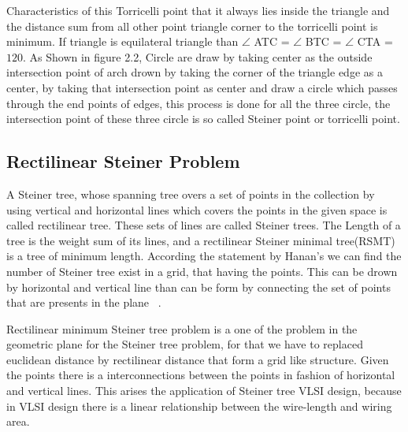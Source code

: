  Characteristics of this Torricelli point that it always lies inside the triangle and the distance sum from all other point triangle corner to the torricelli point is minimum. If triangle is equilateral triangle than $\angle$ ATC = $\angle$ BTC = $\angle$ CTA = $120$. As Shown in figure 2.2, Circle are draw by taking center as the outside intersection point of arch drown by taking the corner of the triangle edge as a center, by taking that intersection point as center and  draw a circle which passes through the end points of edges, this process is done for all the three circle, the intersection point of these three circle is so called Steiner point or torricelli point.   

 
\subsection{Rectilinear Steiner Problem}
A Steiner tree, whose spanning tree overs a set of points in the collection by using vertical and horizontal lines which covers the points in the given space is called rectilinear tree. These sets of lines are called Steiner trees. The Length of a tree is the weight sum of its lines, and a rectilinear Steiner minimal tree(RSMT) is a tree of minimum length. According the statement by Hanan's we can find the number of Steiner tree exist in a grid, that having the points. This can be drown by horizontal and vertical line than can be form by connecting the set of points that are presents in the plane ~\cite{shen}.

Rectilinear minimum Steiner tree problem is a one of the problem in the geometric plane for the Steiner tree problem, for that we have to replaced euclidean distance by rectilinear distance that form a grid like structure. Given the points there is a interconnections between the points in fashion of horizontal and vertical lines. This arises the application of Steiner tree VLSI design, because in VLSI design there is a linear relationship between the wire-length and wiring area.

